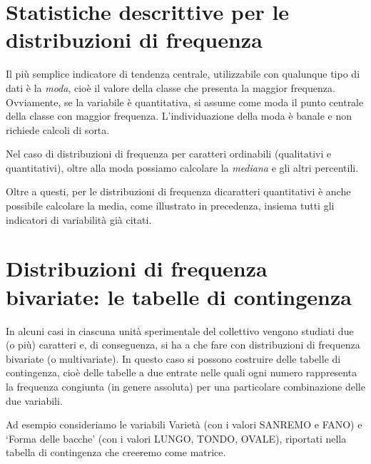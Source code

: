 \documentclass[a4paper,12pt,oneside]{book}
\theoremstyle{definition}
\theoremstyle{definition}
\theoremstyle{definition}
\theoremstyle{remark}
\begin{document}
\section*{Statistiche descrittive per le distribuzioni di
frequenza}\label{statistiche-descrittive-per-le-distribuzioni-di-frequenza}

Il più semplice indicatore di tendenza centrale, utilizzabile con
qualunque tipo di dati è la \emph{moda}, cioè il valore della classe che
presenta la maggior frequenza. Ovviamente, se la variabile è
quantitativa, si assume come moda il punto centrale della classe con
maggior frequenza. L'individuazione della moda è banale e non richiede
calcoli di sorta.

Nel caso di distribuzioni di frequenza per caratteri ordinabili
(qualitativi e quantitativi), oltre alla moda possiamo calcolare la
\emph{mediana} e gli altri percentili.

Oltre a questi, per le distribuzioni di frequenza dicaratteri
quantitativi è anche possibile calcolare la media, come illustrato in
precedenza, insiema tutti gli indicatori di variabilità già citati.

\section*{Distribuzioni di frequenza bivariate: le tabelle di
contingenza}\label{distribuzioni-di-frequenza-bivariate-le-tabelle-di-contingenza}

In alcuni casi in ciascuna unità sperimentale del collettivo vengono
studiati due (o più) caratteri e, di conseguenza, si ha a che fare con
distribuzioni di frequenza bivariate (o multivariate). In questo caso si
possono costruire delle tabelle di contingenza, cioè delle tabelle a due
entrate nelle quali ogni numero rappresenta la frequenza congiunta (in
genere assoluta) per una particolare combinazione delle due variabili.

Ad esempio consideriamo le variabili Varietà (con i valori SANREMO e
FANO) e `Forma delle bacche' (con i valori LUNGO, TONDO, OVALE),
riportati nella tabella di contingenza che creeremo come matrice.
\end{document}

